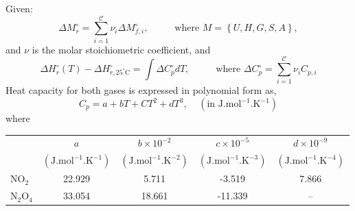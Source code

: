 \documentclass[calculator,allquestions,datasheet,mock,Pens]{exam_newMarcus2}
\newcommand{\summation}[3][error]{\sum\limits_{#2}^{#3}#1}
\begin{document}
\begin{question}
\begin{enumerate}[a)]
         Given:
         \begin{displaymath}
           \Delta M_{r}^{\circ} = \summation[\nu_{i}\Delta M_{f,i}^{\circ}]{i=1}{\mathcal{C}}, \hspace{1cm} \text{ where }M=\left\{U,H,G,S,A\right\}, 
         \end{displaymath}
         and $\nu$ is the molar stoichiometric coefficient, and
         \begin{displaymath}
            \Delta H_{r}^{\circ}(T) - \Delta H_{r,25^{\circ}\text{C}}^{\circ} = \int \Delta C_{p}^{\circ}dT, \hspace{1cm} \text{ where } \Delta C_{p}^{\circ} = \summation[\nu_{i}C_{p,i}]{i=1}{\mathcal{C}}
         \end{displaymath}
     Heat capacity for both gases is expressed in polynomial form as,
  \begin{displaymath}
    C_{p} = a + bT + CT^{2} + dT^{3}, \;\;\;\;\left(\text{in J.mol}^{-1}\text{.K}^{-1}\right)
  \end{displaymath}
  where
  \begin{center}
    \begin{tabular}{ l | c c c c }
      \hline
                         &  $a$     &  $b\times 10^{-2}$  & $c\times 10^{-5}$  & $d\times 10^{-9}$ \\
                         &$\left(\text{J.mol}^{-1}\text{.K}^{-1}\right)$& $\left(\text{J.mol}^{-1}\text{.K}^{-2}\right)$& $\left(\text{J.mol}^{-1}\text{.K}^{-3}\right)$& $\left(\text{J.mol}^{-1}\text{.K}^{-4}\right)$ \\
      \hline
      NO$_{2}$             &  22.929 &      5.711          & -3.519            & 7.866 \\
      N$_{2}$O$_{4}$       &   33.054 &      18.661         &    -11.339        &  -- 
    \end{tabular}
  \end{center}
  \end{enumerate}
  
\end{question}

\clearpage
\end{document}
